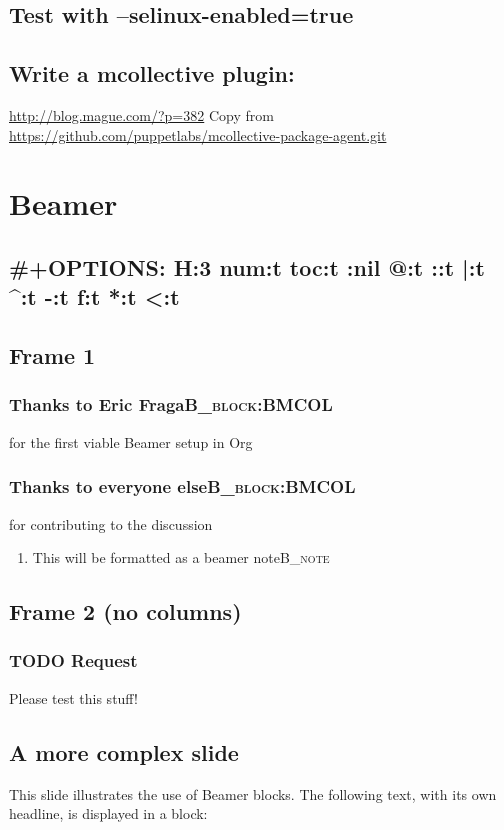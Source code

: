 \documentclass[11pt]{article}
\begin{document}
\subsection{Test with --selinux-enabled=true}
\label{sec-3-10}
\subsection{Write a mcollective plugin:}
\label{sec-3-11}
\url{http://blog.mague.com/?p=382}
Copy from \url{https://github.com/puppetlabs/mcollective-package-agent.git}
\section{Beamer}
\label{sec-4}
\subsection{\#+OPTIONS:   H:3 num:t toc:t \n:nil @:t ::t |:t \^{}:t -:t f:t *:t <:t}
\label{sec-4-1}

\subsection{Frame 1}
\label{sec-4-2}
\subsubsection{Thanks to Eric Fraga\hfill{}\textsc{B_block:BMCOL}}
\label{sec-4-2-1}
for the first viable Beamer setup in Org
\subsubsection{Thanks to everyone else\hfill{}\textsc{B_block:BMCOL}}
\label{sec-4-2-2}
for contributing to the discussion
\begin{enumerate}
\item This will be formatted as a beamer note\hfill{}\textsc{B_note}
\label{sec-4-2-2-1}
\end{enumerate}
\subsection{Frame 2 (no columns)}
\label{sec-4-3}
\subsubsection{{\bfseries\sffamily TODO} Request}
\label{sec-4-3-1}
Please test this stuff!


\subsection{A more complex slide}
\label{sec-4-4}
This slide illustrates the use of Beamer blocks.  The following text,
with its own headline, is displayed in a block:
\end{document}
